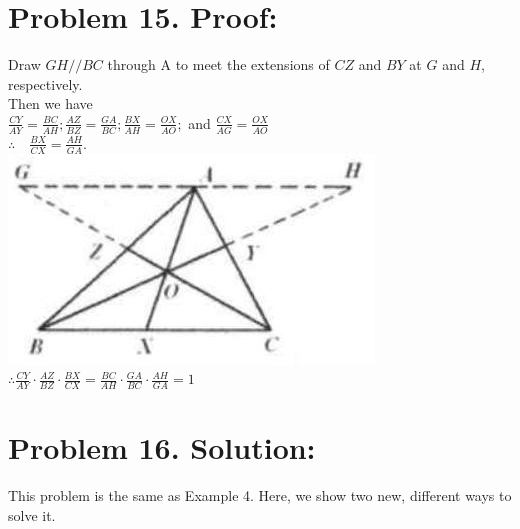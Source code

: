 \documentclass[10pt]{article}
\begin{document}
\section*{Problem 15. Proof:}
Draw \(G H / / B C\) through A to meet the extensions of \(C Z\) and \(B Y\) at \(G\) and \(H\), respectively.\\
Then we have\\
\(\frac{C Y}{A Y}=\frac{B C}{A H} ; \frac{A Z}{B Z}=\frac{G A}{B C} ; \frac{B X}{A H}=\frac{O X}{A O} ;\) and \(\frac{C X}{A G}=\frac{O X}{A O}\)\\
\(\therefore \quad \frac{B X}{C X}=\frac{A H}{G A}\).\\
\includegraphics[max width=\textwidth, center]{2025_04_17_97bc1f7e44d93c271a88g-138}\\
\(\therefore \frac{C Y}{A Y} \cdot \frac{A Z}{B Z} \cdot \frac{B X}{C X}=\frac{B C}{A H} \cdot \frac{G A}{B C} \cdot \frac{A H}{G A}=1\)

\section*{Problem 16. Solution:}
This problem is the same as Example 4. Here, we show two new, different ways to solve it.
\end{document}
